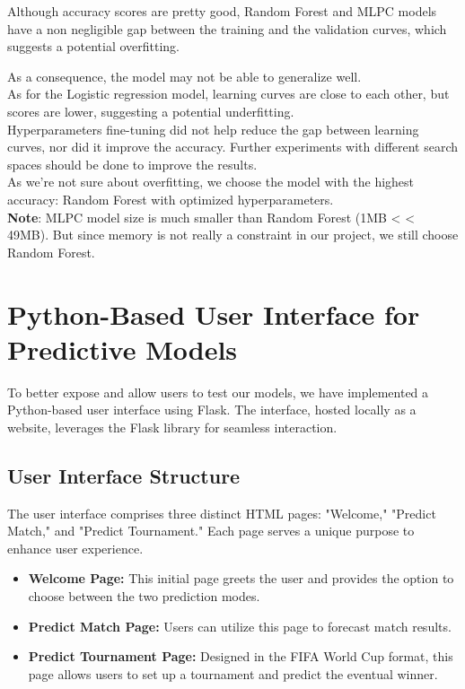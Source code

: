 \documentclass[a4paper,12pt]{article}
\begin{document}
Although accuracy scores are pretty good, Random Forest and MLPC models have a non negligible gap between the training and the validation curves, which suggests a potential overfitting.

As a consequence, the model may not be able to generalize well.\\

As for the Logistic regression model, learning curves are close to each other, but scores are lower, suggesting a potential underfitting.\\

   
Hyperparameters fine-tuning did not help reduce the gap between learning curves, nor did it improve the accuracy. Further experiments with different search spaces should be done to improve the results.\\
  
As we're not sure about overfitting, we choose the model with the highest accuracy: Random Forest with optimized hyperparameters.\\

\textbf{Note}: MLPC model size is much smaller than Random Forest (1MB < < 49MB). But since memory is not really a constraint in our project, we still choose Random Forest.

\section{Python-Based User Interface for Predictive Models}

To better expose and allow users to test our models, we have implemented a Python-based user interface using Flask. The interface, hosted locally as a website, leverages the Flask library for seamless interaction.

\subsection{User Interface Structure}

The user interface comprises three distinct HTML pages: "Welcome," "Predict Match," and "Predict Tournament." Each page serves a unique purpose to enhance user experience.

\begin{itemize}
    \item \textbf{Welcome Page:} This initial page greets the user and provides the option to choose between the two prediction modes.
    \item \textbf{Predict Match Page:} Users can utilize this page to forecast match results.
    \item \textbf{Predict Tournament Page:} Designed in the FIFA World Cup format, this page allows users to set up a tournament and predict the eventual winner.
\end{itemize}
\end{document}
